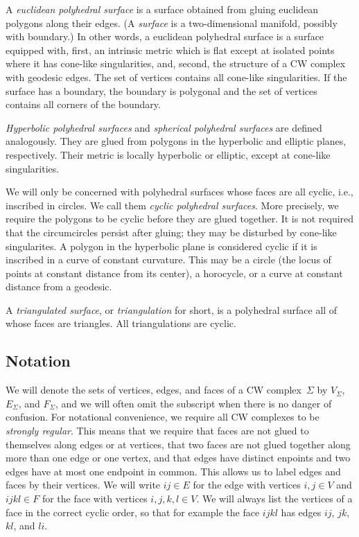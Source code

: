 \documentclass[Thesis.tex]{subfiles}
\begin{document}
A \emph{euclidean polyhedral surface} is a surface obtained from
gluing euclidean polygons along their edges. (A \emph{surface} is a
two-dimensional manifold, possibly with boundary.)  In other words, a
euclidean polyhedral surface is a surface equipped with, first, an
intrinsic metric which is flat except at isolated points where it has
cone-like singularities, and, second, the structure of a CW complex
with geodesic edges. The set of vertices contains all cone-like
singularities. If the surface has a boundary, the boundary is
polygonal and the set of vertices contains all corners of the
boundary.

\emph{Hyperbolic polyhedral surfaces} and \emph{spherical polyhedral
surfaces} are defined analogously. They are glued from polygons in
the hyperbolic and elliptic planes, respectively. Their metric is
locally hyperbolic or elliptic, except at cone-like singularities.

We will only be concerned with polyhedral surfaces whose faces are all
cyclic, i.e., inscribed in circles. We call them \emph{cyclic
polyhedral surfaces}. More precisely, we require the polygons to be
cyclic before they are glued together. It is not required that the
circumcircles persist after gluing; they may be disturbed by cone-like
singularites. A polygon in the hyperbolic plane is considered cyclic
if it is inscribed in a curve of constant curvature. This may be a
circle (the locus of points at constant distance from its center), a
horocycle, or a curve at constant distance from a geodesic.

A \emph{triangulated surface}, or \emph{triangulation} for short, is a
polyhedral surface all of whose faces are triangles.  All
triangulations are cyclic.

\subsection{Notation}

We will denote the sets of vertices, edges, and faces of a CW
complex~$\Sigma$ by $V_{\Sigma}$, $E_{\Sigma}$, and $F_{\Sigma}$, and
we will often omit the subscript when there is no danger of confusion.
For notational convenience, we require all CW complexes to be
\emph{strongly regular}. This means that we require that faces are not
glued to themselves along edges or at vertices, that two faces are not
glued together along more than one edge or one vertex, and that edges
have distinct enpoints and two edges have at most one endpoint in
common. This allows us to label edges and faces by their vertices. We
will write $\mathit{ij}\in E$ for the edge with vertices $i,j\in V$ and
$\mathit{ijkl}\in F$ for the face with vertices $i,j,k,l\in V$. We will always
list the vertices of a face in the correct cyclic order, so that for
example the face $\mathit{ijkl}$ has edges $\mathit{ij}$, $\mathit{jk}$,
$\mathit{kl}$, and $\mathit{li}$.
\end{document}
